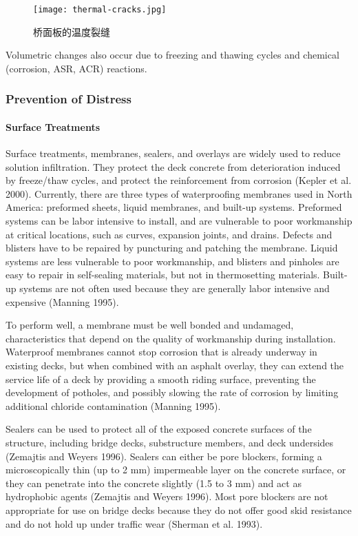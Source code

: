 \begin{figure}
  \texttt{[image: thermal-cracks.jpg]}
  \caption{桥面板的温度裂缝}
  \label{fig:thermal-cracks}
\end{figure}

Volumetric changes also occur due to freezing and thawing cycles and chemical (corrosion, ASR, ACR) reactions.

\subsubsection{Prevention of Distress}

\paragraph{Surface Treatments}
Surface treatments, membranes, sealers, and overlays are widely used to reduce solution infiltration. They protect the deck concrete from deterioration induced by freeze/thaw cycles, and protect the reinforcement from corrosion (Kepler et al. 2000). Currently, there are three types of waterproofing membranes used in North America: preformed sheets, liquid membranes, and built-up systems. Preformed systems can be labor intensive to install, and are vulnerable to poor workmanship at critical locations, such as curves, expansion joints, and drains. Defects and blisters have to be repaired by puncturing and patching the membrane. Liquid systems are less vulnerable to poor workmanship, and blisters and pinholes are easy to repair in self-sealing materials, but not in thermosetting materials. Built-up systems are not often used because they are generally labor intensive and expensive (Manning 1995).

To perform well, a membrane must be well bonded and undamaged, characteristics that depend on the quality of workmanship during installation. Waterproof membranes cannot stop corrosion that is already underway in existing decks, but when combined with an asphalt overlay, they can extend the service life of a deck by providing a smooth riding surface, preventing the development of potholes, and possibly slowing the rate of corrosion by limiting additional chloride contamination (Manning 1995).

Sealers can be used to protect all of the exposed concrete surfaces of the structure, including bridge decks, substructure members, and deck undersides (Zemajtis and Weyers 1996). Sealers can either be pore blockers, forming a microscopically thin (up to 2 mm) impermeable layer on the concrete surface, or they can penetrate into the concrete slightly (1.5 to 3 mm) and act as hydrophobic agents (Zemajtis and Weyers 1996). Most pore blockers are not appropriate for use on bridge decks because they do not offer good skid resistance and do not hold up under traffic wear (Sherman et al. 1993).

